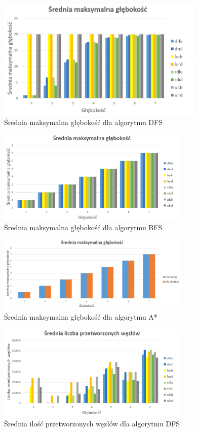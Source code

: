 \documentclass{classrep}
\begin{document}
\begin{figure}[h!]
    \centering
    \includegraphics[width=0.89\textwidth]{maxdepthDFS.png}
    \caption{Średnia maksymalna głębokość dla algorytmu DFS}
	\label{maxdepthDFS}
\end{figure}
\begin{figure}[h!]
    \centering
    \includegraphics[width=0.83\textwidth]{maxdepthBFS.png}
    \caption{Średnia maksymalna głębokość dla algorytmu BFS}
	\label{maxdepthBFS}
\end{figure}
\begin{figure}[h!]
    \centering
    \includegraphics[width=0.83\textwidth]{maxdepthAstar.png}
    \caption{Średnia maksymalna głębokość dla algorytmu A*}
	\label{maxdepthAstar}
\end{figure}
\begin{figure}[h!]
    \centering
    \includegraphics[width=0.83\textwidth]{processedDFS.png}
    \caption{Średnia ilość przetworzonych węzłów dla algorytmu DFS}
	\label{processedDFS}
\end{figure}
\end{document}
